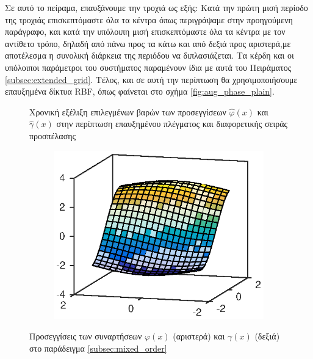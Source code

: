 Σε αυτό το πείραμα, επαυξάνουμε την τροχιά ως εξής: Κατά την πρώτη μισή περίοδο της τροχιάς επισκεπτόμαστε όλα τα κέντρα όπως περιγράψαμε στην προηγούμενη παράγραφο, και κατά την υπόλοιπη μισή επισκεπτόμαστε όλα τα κέντρα με τον αντίθετο τρόπο, δηλαδή από πάνω προς τα κάτω και από δεξιά προς αριστερά,με αποτέλεσμα η συνολική διάρκεια της περιόδου να διπλασιάζεται. Τα κέρδη και οι υπόλοιποι παράμετροι του συστήματος παραμένουν ίδια με αυτά του Πειράματος \ref{subsec:extended_grid}. Τέλος, και σε αυτή την περίπτωση θα χρησιμοποιήσουμε επαυξημένα δίκτυα RBF, όπως φαίνεται στο σχήμα \ref{fig:aug_phase_plain}.

\begin{figure}
	\begin{subfigure}{0.5\textwidth}
		
	\end{subfigure}
	\begin{subfigure}{0.5\textwidth}
		
	\end{subfigure}
	\caption{Χρονική εξέλιξη επιλεγμένων βαρών των προσεγγίσεων $\hat{\varphi}(x)$ και $\hat{\gamma}(x)$ στην περίπτωση επαυξημένου πλέγματος και διαφορετικής σειράς προσπέλασης}
	\label{fig:robot_like_extended_mix_w_conv}
\end{figure}


\begin{figure}
	\begin{subfigure}{0.5\textwidth}
		\includegraphics{plots/conclusions/robot_like_extended_mix/phi_approx.eps}
	\end{subfigure}
	\begin{subfigure}{0.5\textwidth}
		
	\end{subfigure}
	\caption{Προσεγγίσεις των συναρτήσεων $\varphi(x)$ (αριστερά) και $\gamma(x)$ (δεξιά) στο παράδειγμα \ref{subsec:mixed_order}}
	\label{fig:robot_like_extended_mix_approximations}
\end{figure}

